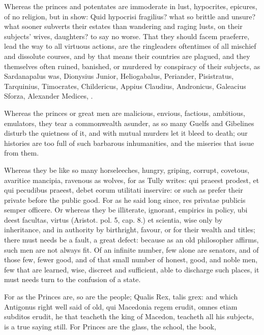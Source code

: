 {Whereas the princes and potentates are immoderate in lust, hypocrites,
epicures, of no religion, but in show: Quid hypocrisi fragilius? what
so brittle and unsure? what sooner subverts their estates than
wandering and raging lusts, on their subjects' wives, daughters? to say
no worse. That they should facem praeferre, lead the way to all
virtuous actions, are the ringleaders oftentimes of all mischief and
dissolute courses, and by that means their countries are plagued,
and they themselves often ruined, banished, or murdered by
conspiracy of their subjects, as Sardanapalus was, Dionysius Junior,
Heliogabalus, Periander, Pisistratus, Tarquinius, Timocrates,
Childericus, Appius Claudius, Andronicus, Galeacius Sforza, Alexander
Medices, \etc{}.

Whereas the princes or great men are malicious, envious, factious,
ambitious, emulators, they tear a commonwealth asunder, as so many
Guelfs and Gibelines disturb the quietness of it, and with mutual
murders let it bleed to death; our histories are too full of such
barbarous inhumanities, and the miseries that issue from them.

Whereas they be like so many horseleeches, hungry, griping, corrupt,
 covetous, avaritice mancipia, ravenous as wolves, for as Tully
writes: qui praeest prodest, et qui pecudibus praeest, debet eorum
utilitati inservire: or such as prefer their private before the public
good. For as he said long since, res privatae publicis semper
officere. Or whereas they be illiterate, ignorant, empirics in policy,
ubi deest facultas, virtus (Aristot. pol. 5, cap. 8.) et scientia,
wise only by inheritance, and in authority by birthright, favour, or
for their wealth and titles; there must needs be a fault, a great
defect: because as an old philosopher affirms, such men are not
always fit. Of an infinite number, few alone are senators, and of those
few, fewer good, and of that small number of honest, good, and noble
men, few that are learned, wise, discreet and sufficient, able to
discharge such places, it must needs turn to the confusion of a state.

For as the Princes are, so are the people; Qualis Rex, talis grex:
and which Antigonus right well said of old, qui Macedonia regem
erudit, omnes etiam subditos erudit, he that teacheth the king of
Macedon, teacheth all his subjects, is a true saying still.
For Princes are the glass, the school, the book,

}
